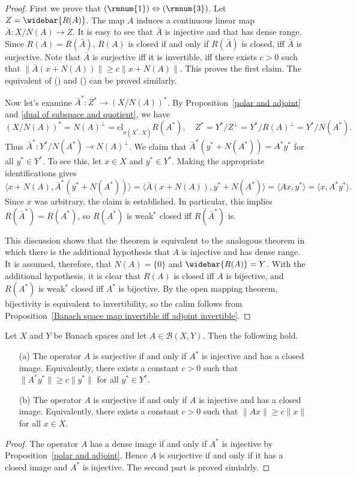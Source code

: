 \begin{proof}
First we prove that $(\rmnum{1})\Leftrightarrow(\rmnum{3})$. Let $Z=\widebar{R(A)}$. The map $A$ induces a continuous linear map $\bar{A}:X/N(A)\to Z$. It is easy to see that $\bar{A}$ is injective and that has dense range. Since $R(A)=R(\bar{A})$, $R(A)$ is closed if and only if $R(\bar{A})$ is closed, iff $\bar{A}$ is surjective. Note that $\bar{A}$ is surjective iff it is invertible, iff there exists $c>0$ such that $\|\bar{A}(x+N(A))\|\geq c\|x+N(A)\|$. This proves the first claim. The equivalent of () and () can be proved similarly.\par
Now let's examine $\bar{A}^*:Z^*\to (X/N(A))^*$. By Proposition~\ref{polar and adjoint} and \ref{dual of subspace and quotient}, we have
\[(X/N(A))^*=N(A)^\bot=\mathrm{cl}_{\sigma(X^*,X)}R(A^*),\quad Z^*=Y^*/Z^\bot=Y^*/R(A)^\bot=Y^*/N(A^*).\]
Thus $\bar{A}^*:Y^*/N(A^*)\to N(A)^\bot$. We claim that $\bar{A}^*(y^*+N(A^*))=A^*y^*$ for all $y^*\in Y^*$. To see this, let $x\in X$ and $y^*\in Y^*$. Making the appropriate identifications gives
\[\langle x+N(A),\bar{A}^*(y^*+N(A^*))\rangle=\langle\bar{A}(x+N(A)),y^*+N(A^*)\rangle=\langle Ax,y^*\rangle=\langle x,A^*y^*\rangle.\]
Since $x$ was arbitrary, the claim is established. In particular, this implies $R(\bar{A}^*)=R(A^*)$, so $R(A^*)$ is weak$^*$ closed iff $R(\bar{A}^*)$ is.\par
This discussion shows that the theorem is equivalent to the analogous theorem in which there is the additional hypothesis that $A$ is injective and has dense range. It is assumed, therefore, that $N(A)=\{0\}$ and $\widebar{R(A)}=Y$. With the additional hypothesis, it is clear that $R(A)$ is closed iff $A$ is bijective, and $R(A^*)$ is weak$^*$ closed iff $A^*$ is bijective. By the open mapping theorem, bijectivity is equivalent to invertibility, so the calim follows from Proposition~\ref{Banach space map invertible iff adjoint invertible}.
\end{proof}
\begin{corollary}
Let $X$ and $Y$ be Banach spaces and let $A\in\mathcal{B}(X,Y)$. Then the following hold.
\begin{itemize}
\item[(a)] The operator $A$ is surjective if and only if $A^*$ is injective and has a closed image. Equivalently, there exists a constant $c>0$ such that $\|A^*y^*\|\geq c\|y^*\|$ for all $y^*\in Y^*$.
\item[(b)] The operator $A$ is surjective if and only if $A$ is injective and has a closed image. Equivalently, there exists a constant $c>0$ such that $\|Ax\|\geq c\|x\|$ for all $x\in X$.
\end{itemize}
\end{corollary}
\begin{proof}
The operator $A$ has a dense image if and only if $A^*$ is injective by Proposition~\ref{polar and adjoint}. Hence $A$ is surjective if and only if it has a closed image and $A^*$ is injective. The second part is proved simialrly.
\end{proof}
